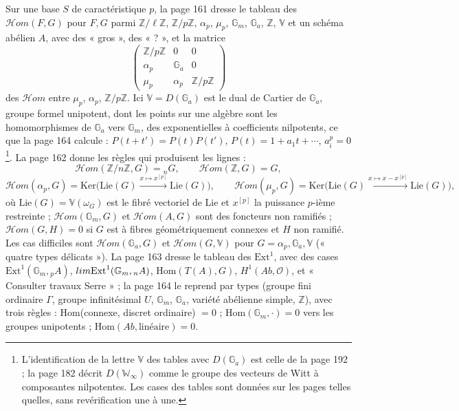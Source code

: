 \documentclass[11pt,a4paper]{article}
\begin{document}
Sur une base $S$ de caractéristique $p$, la page 161 dresse le tableau des
$\mathcal{H}om(F, G)$ pour $F, G$ parmi $\mathbb{Z}/\ell\mathbb{Z}$,
$\mathbb{Z}/p\mathbb{Z}$, $\alpha_p$, $\mu_p$, $\mathbb{G}_m$, $\mathbb{G}_a$,
$\mathbb{Z}$, $\mathbb{V}$ et un schéma abélien $A$, avec des « gros », des
« ? », et la matrice
\[
\begin{pmatrix}
\mathbb{Z}/p\mathbb{Z} & 0 & 0 \\
\alpha_p & \mathbb{G}_a & 0 \\
\mu_p & \alpha_p & \mathbb{Z}/p\mathbb{Z}
\end{pmatrix}
\]
des $\mathcal{H}om$ entre $\mu_p$, $\alpha_p$, $\mathbb{Z}/p\mathbb{Z}$. Ici
$\mathbb{V} = D(\mathbb{G}_a)$ est le dual de Cartier de $\mathbb{G}_a$, groupe
formel unipotent, dont les points sur une algèbre sont les homomorphismes de
$\mathbb{G}_a$ vers $\mathbb{G}_m$, des exponentielles à coefficients nilpotents,
ce que la page 164 calcule : $P(t + t') = P(t)P(t')$, $P(t) = 1 + a_1 t + \cdots$,
$a_i^p = 0$\footnote{L'identification de la lettre $\mathbb{V}$ des tables avec
$D(\mathbb{G}_a)$ est celle de la page 192 ; la page 182 décrit $D(\mathbb{W}_\infty)$
comme le groupe des vecteurs de Witt à composantes nilpotentes. Les cases des
tables sont données sur les pages telles quelles, sans revérification une à une.}.
La page 162 donne les règles qui produisent les lignes :
\[
\mathcal{H}om(\mathbb{Z}/n\mathbb{Z}, G) = {}_nG,\qquad \mathcal{H}om(\mathbb{Z}, G) =
G,
\]
\[
\mathcal{H}om(\alpha_p, G) = \mathrm{Ker}\bigl(\mathrm{Lie}(G) \xrightarrow{x
\mapsto x^{[p]}} \mathrm{Lie}(G)\bigr),
\qquad
\mathcal{H}om(\mu_p, G) = \mathrm{Ker}\bigl(\mathrm{Lie}(G) \xrightarrow{x \mapsto x -
x^{[p]}} \mathrm{Lie}(G)\bigr),
\]
où $\mathrm{Lie}(G) = \mathbb{V}(\omega_G)$ est le fibré vectoriel de Lie et
$x^{[p]}$ la puissance $p$-ième restreinte ; $\mathcal{H}om(\mathbb{G}_m, G)$ et
$\mathcal{H}om(A, G)$ sont des foncteurs non ramifiés ; $\mathcal{H}om(G, H) = 0$ si
$G$ est à fibres géométriquement connexes et $H$ non ramifié. Les cas difficiles
sont $\mathcal{H}om(\mathbb{G}_a, G)$ et $\mathcal{H}om(G, \mathbb{V})$ pour $G =
\alpha_p, \mathbb{G}_a, \mathbb{V}$ (« quatre types délicats »). La page 163 dresse le
tableau des $\mathrm{Ext}^1$, avec des cases $\mathrm{Ext}^1(\mathbb{G}_m, {}_pA)$,
$\varinjlim \mathrm{Ext}^1(\mathbb{G}_m, {}_nA)$, $\mathrm{Hom}(T(A), G)$, $H^1(Ab,
\mathcal{O})$, et « Consulter travaux Serre » ; la page 164 le reprend par types
(groupe fini ordinaire $\Gamma$, groupe infinitésimal $U$, $\mathbb{G}_m$,
$\mathbb{G}_a$, variété abélienne simple, $\mathbb{Z}$), avec trois règles :
$\mathrm{Hom}$(connexe, discret ordinaire) $= 0$ ; $\mathrm{Hom}(\mathbb{G}_m,
\cdot) = 0$ vers les groupes unipotents ; $\mathrm{Hom}(Ab, \text{linéaire}) = 0$.
\end{document}
